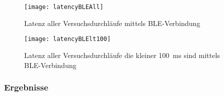 \begin{figure}[H]
    \centering
    \texttt{[image: latencyBLEAll]}
    \caption{Latenz aller Versuchsdurchläufe mittels \ac{BLE}-Verbindung}
    \label{fig:latencyBLEAll}
\end{figure}

\begin{figure}[H]
    \centering
    \texttt{[image: latencyBLElt100]}
    \caption{Latenz aller Versuchsdurchläufe die kleiner 100~ms sind mittels \ac{BLE}-Verbindung}
    \label{fig:latencyBLElt100}
\end{figure}

\subsubsection{Ergebnisse}
